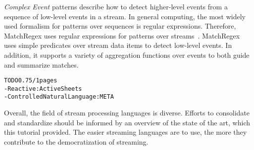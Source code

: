 \emph{Complex Event} patterns describe how to detect higher-level
events from a sequence of low-level events in a stream. In general
computing, the most widely used formalism for patterns over sequences
is regular expressions. Therefore, MatchRegex uses regular expressions
for patterns over streams~\cite{hirzel_2012}. Match\-Regex uses simple
predicates over stream data items to detect low-level events. In
addition, it supports a variety of aggregation functions over events
to both guide and summarize matches.

\begin{alltt}TODO\scriptsize 0.75/1 pages
- Reactive: ActiveSheets \cite{vaziri_et_al_2014}
- Controlled Natural Language: META \cite{arnold_et_al_2016}
\end{alltt}

Overall, the field of stream processing languages is diverse.  Efforts
to consolidate and standardize should be informed by an overview of
the state of the art, which this tutorial provided. The easier
streaming languages are to use, the more they contribute to the
democratization of streaming.
